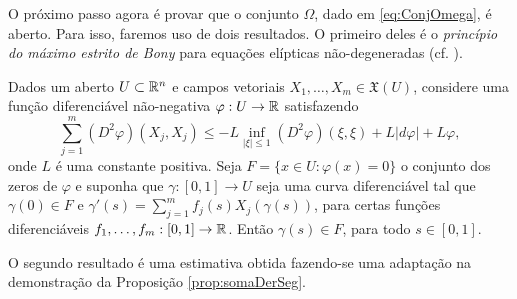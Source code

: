 O pr\'oximo passo agora \'e provar que o conjunto $\Omega$,
dado em \eqref{eq:ConjOmega}, \'e aberto. Para isso, faremos
uso de dois resultados. O primeiro deles \'e o {\em princ\'ipio
do m\'aximo estrito de Bony} para equa\c c\~oes el\'ipticas 
n\~ao-degeneradas (cf. \cite[Corollary 9.7]{Brendle2010}).

\begin{teorema} \label{teo:bony}
Dados um aberto $U\subset\mathbb R^n$ e campos vetoriais 
$X_1,\ldots,X_m\in\mathfrak{X}(U)$, considere uma fun\c c\~ao
diferenci\'avel n\~ao-negativa $\varphi:U\to\mathbb R$ satisfazendo
\begin{equation*}
\sum_{j=1}^{m} (D^2 \varphi)(X_j,X_j) \leq -L \inf_{|\xi| \leq 1} 
(D^2 \varphi)(\xi,\xi) + L |d \varphi| + L \varphi,
\end{equation*}
onde $L$ é uma constante positiva. Seja $F=\{x\in U:\varphi(x)=0\}$
o conjunto dos zeros de $\varphi$ e suponha que $\gamma:[0,1]\to U$
seja uma curva diferenciável tal que $\gamma(0)\in F$ e 
$\gamma'(s) = \displaystyle\sum_{j=1}^{m} f_j(s) X_j(\gamma(s))$, para certas
funções diferenciáveis $f_1,\ldots,f_m:[0,1]\to\mathbb R$. Então 
$\gamma(s)\in F$, para todo $s\in[0,1]$.
\end{teorema}

O segundo resultado \'e uma estimativa obtida fazendo-se uma
adapta\c c\~ao na demonstra\c c\~ao da Proposi\c c\~ao
\ref{prop:somaDerSeg}.

